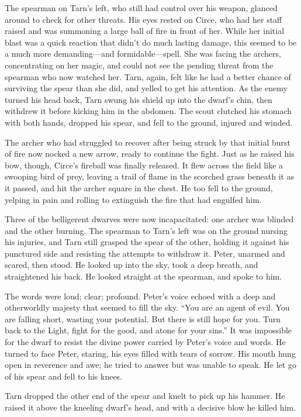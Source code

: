 The spearman on Tarn's left, who still had control over his weapon, glanced around to check for other threats.  His eyes rested on Circe, who had her staff raised and was summoning a large ball of fire in front of her.  While her initial blast was a quick reaction that didn't do much lasting damage, this seemed to be a much more demanding---and formidable---spell.  She was facing the archers, concentrating on her magic, and could not see the pending threat from the spearman who now watched her.  Tarn, again, felt like he had a better chance of surviving the spear than she did, and yelled to get his attention.  As the enemy turned his head back, Tarn swung his shield up into the dwarf's chin, then withdrew it before kicking him in the abdomen.  The scout clutched his stomach with both hands, dropped his spear, and fell to the ground, injured and winded.

The archer who had struggled to recover after being struck by that initial burst of fire now nocked a new arrow, ready to continue the fight.  Just as he raised his bow, though, Circe's fireball was finally released.  It flew across the field like a swooping bird of prey, leaving a trail of flame in the scorched grass beneath it as it passed, and hit the archer square in the chest.  He too fell to the ground, yelping in pain and rolling to extinguish the fire that had engulfed him.

Three of the belligerent dwarves were now incapacitated: one archer was blinded and the other burning.  The spearman to Tarn's left was on the ground nursing his injuries, and Tarn still grasped the spear of the other, holding it against his punctured side and resisting the attempts to withdraw it.  Peter, unarmed and scared, then stood.  He looked up into the sky, took a deep breath, and straightened his back.  He looked straight at the spearman, and spoke to him.

The words were loud; clear; profound.  Peter's voice echoed with a deep and otherworldly majesty that seemed to fill the sky.   ``You are an agent of evil.  You are falling short, wasting your potential.  But there is still hope for you.  Turn back to the Light, fight for the good, and atone for your sins.'' It was impossible for the dwarf to resist the divine power carried by Peter's voice and words.  He turned to face Peter, staring, his eyes filled with tears of sorrow.  His mouth hung open in reverence and awe; he tried to answer but was unable to speak.  He let go of his spear and fell to his knees.

Tarn dropped the other end of the spear and knelt to pick up his hammer.  He raised it above the kneeling dwarf's head, and with a decisive blow he killed him.

